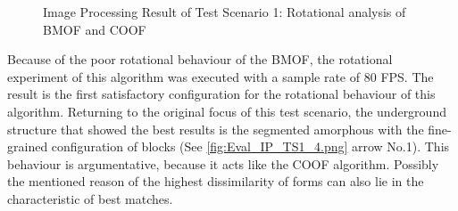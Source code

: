\begin{figure}[H]
	\hfill
	\caption{Image Processing Result of Test Scenario 1: Rotational analysis of BMOF and COOF}
	\label{fig:Eval_IP_TS1_3.png}
\end{figure}


Because of the poor rotational behaviour of the \gls{BMOF}, the rotational experiment of this algorithm was executed with a sample rate of 80 \gls{FPS}. The result is the first satisfactory configuration for the rotational behaviour of this algorithm. Returning to the original focus of this test scenario, the underground structure that showed the best results is the segmented amorphous with the fine-grained configuration of blocks (See \ref{fig:Eval_IP_TS1_4.png} arrow No.1). This behaviour is argumentative, because it acts like the \gls{COOF} algorithm. Possibly the mentioned reason of the highest dissimilarity of forms can also lie in the characteristic of best matches.

